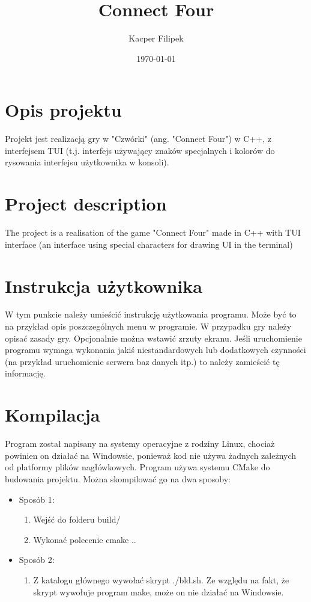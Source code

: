 \documentclass{book}
\title{Connect Four}
\author{Kacper Filipek}
\date{\today}
\begin{document}
\maketitle

\section{Opis projektu}

Projekt jest realizacją gry w "Czwórki" (ang. "Connect Four") w C++, z interfejsem TUI (t.j. interfejs używający znaków specjalnych i kolorów do rysowania interfejsu użytkownika w konsoli).


\section{Project description}

The project is a realisation of the game "Connect Four" made in C++ with TUI interface (an interface using special characters for drawing UI in the terminal)

\section{Instrukcja użytkownika}

W tym punkcie należy umieścić instrukcję użytkowania programu. 
Może być to na przykład opis poszczególnych menu w programie. 
W przypadku gry należy opisać zasady gry. 
Opcjonalnie można wstawić zrzuty ekranu. 
Jeśli uruchomienie programu wymaga wykonania jakiś 
niestandardowych lub dodatkowych czynności 
(na przykład uruchomienie serwera baz danych itp.) 
to należy zamieścić tę informację.

\section{Kompilacja}

Program został napisany na systemy operacyjne z rodziny Linux, 
chociaż powinien on działać na Windowsie, ponieważ kod nie 
używa żadnych zależnych od platformy plików nagłówkowych. 
Program używa  systemu CMake do budowania projektu. 
Można skompilować go na dwa sposoby:
    \begin{itemize}
         
    \item Sposób 1:
        \begin{enumerate}
            \item Wejść do folderu build/
            \item Wykonać polecenie cmake ..
        \end{enumerate}

    \item Sposób 2:
        \begin{enumerate}
            \item Z katalogu głównego wywołać skrypt ./bld.sh. Ze względu na fakt, że skrypt wywołuje program make, może on nie działać na Windowsie.
        \end{enumerate}

    \end{itemize}
\end{document}
